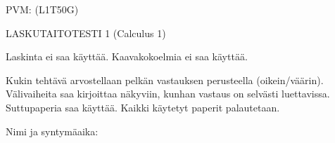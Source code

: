 \documentclass[finnish, a4paper, 12pt]{article}
\begin{document}
	
	
		PVM: \underline{\phantom{mm.mm.}}
		\hfill
		(L1T50G)	%
	
	\begin{center}
		{\large
			LASKUTAITOTESTI 1 (Calculus 1)}
	\end{center}
	
	Laskinta ei saa käyttää. Kaavakokoelmia ei saa käyttää.
	
	Kukin tehtävä arvostellaan pelkän vastauksen perusteella (oikein/väärin).
	Välivaiheita saa kirjoittaa näkyviin, kunhan vastaus on selvästi luettavissa.
	Suttupaperia saa käyttää. Kaikki käytetyt paperit palautetaan.
	
\vspace{12pt}
Nimi ja syntymäaika: \phantom{m} \hrulefill
\vspace{8pt}
	
\end{document}
